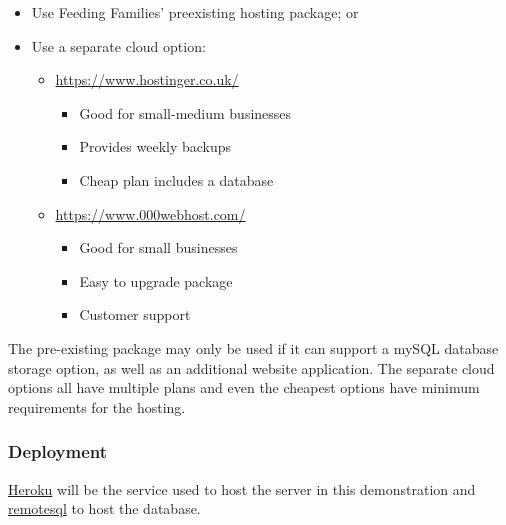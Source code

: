 \documentclass[12pt]{article}
\begin{document}
\begin{itemize}
   \item Use Feeding Families' preexisting hosting package; or
   \item Use a separate cloud option:
   \begin{itemize}
        \item \href{https://www.hostinger.co.uk/}{https://www.hostinger.co.uk/}
            \begin{itemize}
                \item Good for small-medium businesses
                \item Provides weekly backups
                \item Cheap plan includes a database
            \end{itemize}
        \item \href{https://www.000webhost.com/}{https://www.000webhost.com/}
            \begin{itemize}
                \item Good for small businesses
                \item Easy to upgrade package
                \item Customer support
            \end{itemize}
   \end{itemize}
\end{itemize}

The pre-existing package may only be used if it can support a mySQL database storage option, as well as an additional website application. The separate cloud options all have multiple plans and even the cheapest options have minimum requirements for the hosting.

\newpage
\subsubsection{Deployment}
\href{https://www.heroku.com/}{Heroku} will be the service used to host the server in this demonstration and \href{https://remotemysql.com/}{remotesql} to host the database.\\
\end{document}
